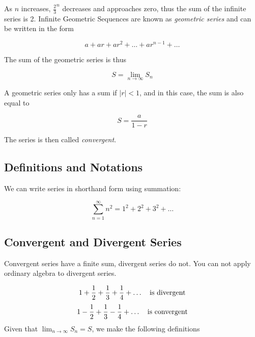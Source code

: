 \documentclass[svgnames]{article}   	%
\begin{document}
As $n$ increases, $\frac{2}{3}^n$ decreases and approaches zero, thus the sum
of the infinite series is 2. 
\vspace{5px}
Infinite Geometric Sequences are known as \textit{geometric series} and can be
written in the form 

\vspace{5px} \[
  a + ar + ar^2 + \dots + ar^{n-1} + \dots
\] \vspace{5px}

The sum of the geometric series is thus 

\vspace{5px} \[
  S = \lim_{n\to\infty} S_n
\] \vspace{5px}

A geometric series only has a sum if $|r| < 1$, and in this case, the sum is
also equal to

\vspace{5px} 
\begin{tcolorbox}
  \[
S = \frac{a}{1-r}
\] 
\end{tcolorbox}\vspace{5px}

The series is then called \textit{convergent}.

\subsection{Definitions and Notations}
\vspace{5px}
We can write series in shorthand form using summation: 

\vspace{5px} \[
\sum_{n=1}^{\infty} n^2 = 1^2 + 2^2 + 3^2 + \dots  
\] \vspace{5px}

\subsection{Convergent and Divergent Series}
\vspace{5px}

Convergent series have a finite sum, divergent series do not. You can not apply
ordinary algebra to divergent series. 

\vspace{5px} \[
1 + \frac{1}{2} + \frac{1}{3} + \frac{1}{4} + \dots \hspace{10px} \text{is
divergent}
\]
\[
  1 - \frac{1}{2} + \frac{1}{3} - \frac{1}{4} + \dots \hspace{10px} \text{is
    convergent}
\] \vspace{5px}
Given that $\lim_{n\to\infty} S_n = S$, we make the following definitions 
\end{document}
